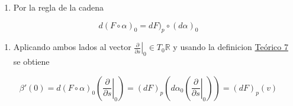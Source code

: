 \begin{bookproof}{}
\begin{enumerate}
\item Por la regla de la cadena
\end{enumerate}
\[
d(F\circ\alpha)_0=dF)_p\circ(d\alpha)_0
\]
\begin{enumerate}[start=2]
\item Aplicando ambos lados al vector $\left.\frac{\partial}{\partial s}\right|_0\in T_0\mathbb R$ y usando la definicion \hyperref[blk:0106aa]{Teórico 7} se obtiene
\end{enumerate}
\[
\beta'(0)=d(F\circ\alpha)_0\left(\left.\frac{\partial}{\partial s}\right|_0\right)=(dF)_p\left(d\alpha_0\left(\left.\frac{\partial}{\partial s}\right|_0\right)\right)=(dF)_p(v)
\]
\bookqed
\end{bookproof}
